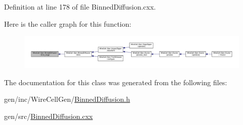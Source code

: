 Definition at line 178 of file Binned\+Diffusion.\+cxx.

Here is the caller graph for this function\+:
\nopagebreak
\begin{figure}[H]
\begin{center}
\leavevmode
\includegraphics[width=350pt]{class_wire_cell_1_1_gen_1_1_binned_diffusion_a68d4bec483da54816b4face2f8241fd8_icgraph}
\end{center}
\end{figure}


The documentation for this class was generated from the following files\+:\begin{DoxyCompactItemize}
\item 
gen/inc/\+Wire\+Cell\+Gen/\hyperlink{_binned_diffusion_8h}{Binned\+Diffusion.\+h}\item 
gen/src/\hyperlink{_binned_diffusion_8cxx}{Binned\+Diffusion.\+cxx}\end{DoxyCompactItemize}
